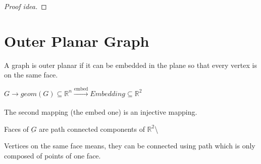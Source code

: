 \documentclass{article}
\def\R{\mathbb{R}}
\begin{document}
\begin{proof}[Proof idea]
%    
%    
%    
%    
%    
%    
%    
\end{proof}


\section{Outer Planar Graph}
\begin{definition}
A graph is outer planar if it can be embedded in the plane so that every vertex is on the same face.

${G \rightarrow geom (G) \subseteq {\R^n} \xrightarrow[\text{}]{\text{embed}} Embedding  \subseteq {\R^2}}$

The second mapping (the embed one) is an injective mapping.

\end{definition}


\begin{definition}
Faces of $\underbar{G}$ are path connected components of ${\R^2}$\textbackslash{} 
\end{definition}

\begin{definition}
    Vertices on the same face means, they can be connected using path which is only composed of points of one face.
\end{definition}
\end{document}
